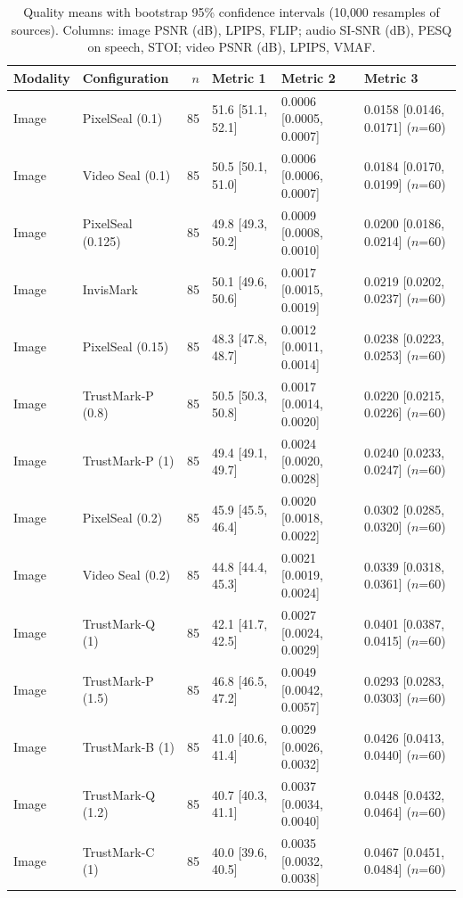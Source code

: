\begin{table}[!t]
\centering
\footnotesize
\caption{Quality means with bootstrap 95\% confidence intervals (10{,}000 resamples of sources). Columns: image PSNR (dB), LPIPS, FLIP; audio SI-SNR (dB), PESQ on speech, STOI; video PSNR (dB), LPIPS, VMAF.}
\label{tab:wm-ci}
\setlength{\tabcolsep}{3.4pt}
\begin{tabular}{llrlll}
\toprule
Modality & Configuration & $n$ & Metric 1 & Metric 2 & Metric 3 \\
\midrule
Image & PixelSeal (0.1) & 85 & 51.6 [51.1, 52.1] & 0.0006 [0.0005, 0.0007] & 0.0158 [0.0146, 0.0171] \tiny($n$=60) \\
Image & Video Seal (0.1) & 85 & 50.5 [50.1, 51.0] & 0.0006 [0.0006, 0.0007] & 0.0184 [0.0170, 0.0199] \tiny($n$=60) \\
Image & PixelSeal (0.125) & 85 & 49.8 [49.3, 50.2] & 0.0009 [0.0008, 0.0010] & 0.0200 [0.0186, 0.0214] \tiny($n$=60) \\
Image & InvisMark & 85 & 50.1 [49.6, 50.6] & 0.0017 [0.0015, 0.0019] & 0.0219 [0.0202, 0.0237] \tiny($n$=60) \\
Image & PixelSeal (0.15) & 85 & 48.3 [47.8, 48.7] & 0.0012 [0.0011, 0.0014] & 0.0238 [0.0223, 0.0253] \tiny($n$=60) \\
Image & TrustMark-P (0.8) & 85 & 50.5 [50.3, 50.8] & 0.0017 [0.0014, 0.0020] & 0.0220 [0.0215, 0.0226] \tiny($n$=60) \\
Image & TrustMark-P (1) & 85 & 49.4 [49.1, 49.7] & 0.0024 [0.0020, 0.0028] & 0.0240 [0.0233, 0.0247] \tiny($n$=60) \\
Image & PixelSeal (0.2) & 85 & 45.9 [45.5, 46.4] & 0.0020 [0.0018, 0.0022] & 0.0302 [0.0285, 0.0320] \tiny($n$=60) \\
Image & Video Seal (0.2) & 85 & 44.8 [44.4, 45.3] & 0.0021 [0.0019, 0.0024] & 0.0339 [0.0318, 0.0361] \tiny($n$=60) \\
Image & TrustMark-Q (1) & 85 & 42.1 [41.7, 42.5] & 0.0027 [0.0024, 0.0029] & 0.0401 [0.0387, 0.0415] \tiny($n$=60) \\
Image & TrustMark-P (1.5) & 85 & 46.8 [46.5, 47.2] & 0.0049 [0.0042, 0.0057] & 0.0293 [0.0283, 0.0303] \tiny($n$=60) \\
Image & TrustMark-B (1) & 85 & 41.0 [40.6, 41.4] & 0.0029 [0.0026, 0.0032] & 0.0426 [0.0413, 0.0440] \tiny($n$=60) \\
Image & TrustMark-Q (1.2) & 85 & 40.7 [40.3, 41.1] & 0.0037 [0.0034, 0.0040] & 0.0448 [0.0432, 0.0464] \tiny($n$=60) \\
Image & TrustMark-C (1) & 85 & 40.0 [39.6, 40.5] & 0.0035 [0.0032, 0.0038] & 0.0467 [0.0451, 0.0484] \tiny($n$=60) \\

\end{tabular}
\end{table}
